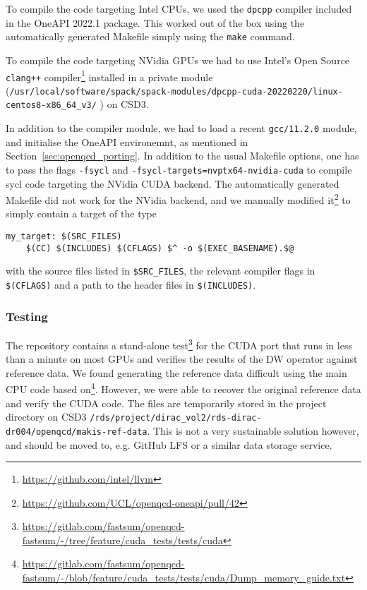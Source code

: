 To compile the code targeting Intel CPUs, we used the \texttt{dpcpp} compiler included in the OneAPI 2022.1 package.
This worked out of the box using the automatically generated Makefile simply using the \texttt{make} command.

To compile the code targeting NVidia GPUs we had to use Intel's Open Source \verb #clang++# compiler\footnote{\url{https://github.com/intel/llvm}} installed in a private module (\verb #/usr/local/software/spack/spack-modules/dpcpp-cuda-20220220/linux-centos8-x86_64_v3/# ) on CSD3.

In addition to the compiler module, we had to load a recent \verb #gcc/11.2.0# module, and initialise the OneAPI environemnt, as mentioned in Section~\ref{sec:openqcd_porting}.
In addition to the usual Makefile options, one has to pass the flags \verb #-fsycl# and \verb #-fsycl-targets=nvptx64-nvidia-cuda# to compile sycl code targeting the NVidia CUDA backend.
The automatically generated Makefile did not work for the NVidia backend, and we manually modified it\footnote{\url{https://github.com/UCL/openqcd-oneapi/pull/42}} to simply contain a target of the type
\begin{verbatim}
my_target: $(SRC_FILES)
	$(CC) $(INCLUDES) $(CFLAGS) $^ -o $(EXEC_BASENAME).$@
\end{verbatim}
with the source files listed in \verb #$SRC_FILES#, the relevant compiler flags in \verb #$(CFLAGS)# and a path to the header files in \verb #$(INCLUDES)#.


\subsubsection{Testing}\label{testing_openqcd}

The repository contains a stand-alone test\footnote{\url{https://gitlab.com/fastsum/openqcd-fastsum/-/tree/feature/cuda_tests/tests/cuda}} for the CUDA port that runs in less than a minute on most GPUs and verifies the results of the DW operator against reference data.
We found generating the reference data difficult using the main CPU code based on\footnote{\url{https://gitlab.com/fastsum/openqcd-fastsum/-/blob/feature/cuda_tests/tests/cuda/Dump\_memory\_guide.txt}}.
However, we were able to recover the original reference data and verify the CUDA code.
The files are temporarily stored in the project directory on CSD3 \texttt{/rds/project/dirac\_vol2/rds-dirac-dr004/openqcd/makis-ref-data}.
This is not a very sustainable solution however, and should be moved to, e.g. GitHub LFS or a similar data storage service.

